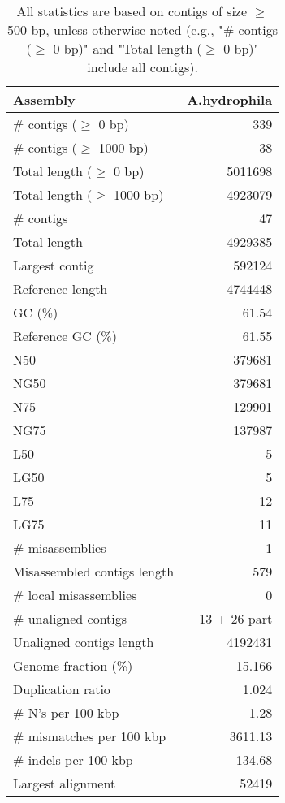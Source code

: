 \documentclass[12pt,a4paper]{article}
\begin{document}
\begin{table}[ht]
\begin{center}
\caption{All statistics are based on contigs of size $\geq$ 500 bp, unless otherwise noted (e.g., "\# contigs ($\geq$ 0 bp)" and "Total length ($\geq$ 0 bp)" include all contigs).}
\begin{tabular}{|l*{1}{|r}|}
\hline
Assembly & A.hydrophila \\ \hline
\# contigs ($\geq$ 0 bp) & 339 \\ \hline
\# contigs ($\geq$ 1000 bp) & 38 \\ \hline
Total length ($\geq$ 0 bp) & 5011698 \\ \hline
Total length ($\geq$ 1000 bp) & 4923079 \\ \hline
\# contigs & 47 \\ \hline
Total length & 4929385 \\ \hline
Largest contig & 592124 \\ \hline
Reference length & 4744448 \\ \hline
GC (\%) & 61.54 \\ \hline
Reference GC (\%) & 61.55 \\ \hline
N50 & 379681 \\ \hline
NG50 & 379681 \\ \hline
N75 & 129901 \\ \hline
NG75 & 137987 \\ \hline
L50 & 5 \\ \hline
LG50 & 5 \\ \hline
L75 & 12 \\ \hline
LG75 & 11 \\ \hline
\# misassemblies & 1 \\ \hline
Misassembled contigs length & 579 \\ \hline
\# local misassemblies & 0 \\ \hline
\# unaligned contigs & 13 + 26 part \\ \hline
Unaligned contigs length & 4192431 \\ \hline
Genome fraction (\%) & 15.166 \\ \hline
Duplication ratio & 1.024 \\ \hline
\# N's per 100 kbp & 1.28 \\ \hline
\# mismatches per 100 kbp & 3611.13 \\ \hline
\# indels per 100 kbp & 134.68 \\ \hline
Largest alignment & 52419 \\ \hline
\end{tabular}
\end{center}
\end{table}
\end{document}
